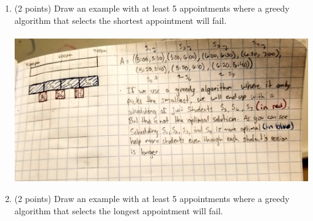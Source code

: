 \documentclass[12pt]{article}
\begin{document}
\begin{enumerate}
\pagebreak
\begin{enumerate}
    \item \label{1a} (2 points) Draw an example with at least 5 appointments where a greedy algorithm
    that selects the shortest appointment will fail.\\\\
\includegraphics[scale=.15]{1a}
\pagebreak
\item \label{1b} (2 points) Draw an example with at least 5 appointments where a greedy algorithm
    that selects the longest appointment will fail.\\\\

\end{enumerate}
\end{enumerate}
\end{document}
